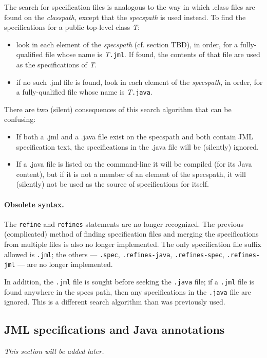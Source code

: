 \documentclass{report}%
\begin{document}
The search for specification files is analogous to the way in  which .class files are found on the {\it classpath}, except that the {\it specspath} is used instead. To find the specifications for a public top-level class {\it T}:
\begin{itemize} 
\item look in each element of the {\it specspath} (cf. section TBD), in order, for a fully-qualified file whose name is {\it T}{\tt .jml}.
If found, the contents of that file are used as the specifications of {\it T}.
\item if no such .jml file is found, look in each element of the {\it specspath}, in order, for a fully-qualified file whose name is {\it T}{\tt .java}.
\end{itemize}
There are two (silent) consequences of this search algorithm that can be confusing:
\begin{itemize}
\item If both a .jml and a .java file exist on the specspath and both contain JML specification text, the specifications in the .java file will be (silently) ignored.
\item If a .java file is listed on the command-line it will be compiled (for its Java content), but if it is not a member of an element of the specspath, it will (silently) not be used as the source of specifications for itself.
\end{itemize}

\paragraph{Obsolete syntax.} The {\tt refine} and {\tt refines} statements are no longer recognized.
The previous (complicated) method of finding specification files and merging the specifications
from multiple files is also no longer implemented. The only specification file suffix allowed is 
{\tt .jml}; the others --- {\tt .spec}, {\tt .refines-java}, {\tt .refines-spec}, {\tt .refines-jml} --- 
are no longer implemented.

In addition, the {\tt .jml} file is sought before seeking the {\tt .java} file; if a {\tt .jml}
file is found anywhere in the specs path, then any specifications in the {\tt .java} file are 
ignored. This is a different search algorithm than was previously used.

\subsection{JML specifications and Java annotations}
\textit{This section will be added later.} %
\end{document}
